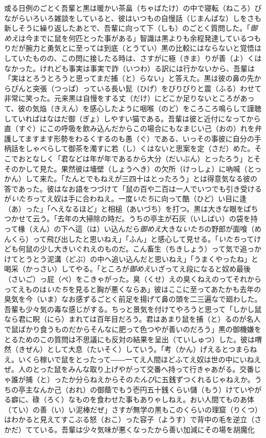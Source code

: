 \documentclass{book}
\begin{document}
或る日例のごとく吾輩と黒は暖かい茶畠（ちゃばたけ）の中で寝転（ねころ）びながらいろいろ雑談をしていると、彼はいつもの自慢話（じまんばな）しをさも新しそうに繰り返したあとで、吾輩に向って下（しも）のごとく質問した。「\emph{御めえ}は今までに鼠を何匹とった事がある」智識は黒よりも余程発達しているつもりだが腕力と勇気とに至っては到底（とうてい）黒の比較にはならないと覚悟はしていたものの、この問に接したる時は、さすがに極（きま）りが善（よ）くはなかった。けれども事実は事実で詐（いつわ）る訳には行かないから、吾輩は「実はとろうとろうと思ってまだ捕（と）らない」と答えた。黒は彼の鼻の先からぴんと突張（つっぱ）っている長い髭（ひげ）をびりびりと震（ふる）わせて非常に笑った。元来黒は自慢をする丈（だけ）にどこか足りないところがあって、彼の気焔（きえん）を感心したように咽喉（のど）をころころ鳴らして謹聴していればはなはだ御（ぎょ）しやすい猫である。吾輩は彼と近付になってから直（すぐ）にこの呼吸を飲み込んだからこの場合にもなまじい己（おの）れを弁護してますます形勢をわるくするのも愚（ぐ）である、いっその事彼に自分の手柄話をしゃべらして御茶を濁すに若（し）くはないと思案を定（さだ）めた。そこでおとなしく「君などは年が年であるから大分（だいぶん）とったろう」とそそのかして見た。果然彼は墻壁（しょうへき）の欠所（けっしょ）に吶喊（とっかん）して来た。「たんとでもねえが三四十はとったろう」とは得意気なる彼の答であった。彼はなお語をつづけて「鼠の百や二百は一人でいつでも引き受けるが\emph{いたち}ってえ奴は手に合わねえ。一度\emph{いたち}に向って酷（ひど）い目に逢（あ）った」「へえなるほど」と相槌（あいづち）を打つ。黒は大きな眼をぱちつかせて云う。「去年の大掃除の時だ。うちの亭主が石灰（いしばい）の袋を持って椽（えん）の下へ這（は）い込んだら\emph{御めえ}大きな\emph{いたち}の野郎が面喰（めんくら）って飛び出したと思いねえ」「ふん」と感心して見せる。「\emph{いたち}ってけども何鼠の少し大きいぐれえのものだ。こん畜生（ちきしょう）って気で追っかけてとうとう泥溝（どぶ）の中へ追い込んだと思いねえ」「うまくやったね」と喝采（かっさい）してやる。「ところが\emph{御めえ}いざってえ段になると奴め最後（さいご）っ屁（ぺ）をこきゃがった。臭（くせ）えの臭くねえのってそれからってえものは\emph{いたち}を見ると胸が悪くならあ」彼はここに至ってあたかも去年の臭気を今（いま）なお感ずるごとく前足を揚げて鼻の頭を二三遍なで廻わした。吾輩も少々気の毒な感じがする。ちっと景気を付けてやろうと思って「しかし鼠なら君に睨（にら）まれては百年目だろう。君はあまり鼠を捕（と）るのが名人で鼠ばかり食うものだからそんなに肥って色つやが善いのだろう」黒の御機嫌をとるためのこの質問は不思議にも反対の結果を呈出（ていしゅつ）した。彼は喟然（きぜん）として大息（たいそく）していう。「考（かん）げえるとつまらねえ。いくら稼いで鼠をとったって――一てえ人間ほどふてえ奴は世の中にいねえぜ。人のとった鼠をみんな取り上げやがって交番へ持って行きゃあがる。交番じゃ誰が捕（と）ったか分らねえからその\emph{たんび}に五銭ずつくれるじゃねえか。うちの亭主なんか己（おれ）の御蔭でもう壱円五十銭くらい儲（もう）けていやがる癖に、碌（ろく）なものを食わせた事もありゃしねえ。おい人間てものあ体（てい）の善（い）い泥棒だぜ」さすが無学の黒もこのくらいの理窟（りくつ）はわかると見えてすこぶる怒（おこ）った容子（ようす）で背中の毛を逆立（さかだ）てている。吾輩は少々気味が悪くなったから善い加減にその場を胡魔化
\end{document}
